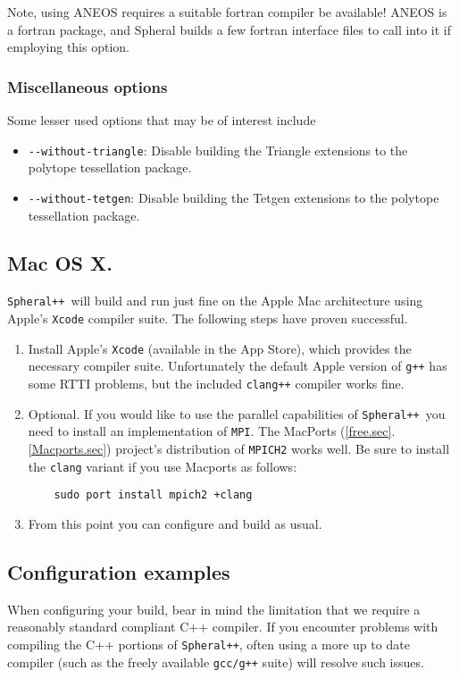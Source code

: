 \documentclass{article}
\newcommand{\Spheral}{{\tt Spheral++}}
\begin{document}
Note, using ANEOS requires a suitable fortran compiler be available!  ANEOS is a
fortran package, and Spheral builds a few fortran interface files to call into
it if employing this option.

\subsubsection{Miscellaneous options}
Some lesser used options that may be of interest include
\begin{itemize}
\item \verb+--without-triangle+: Disable building the Triangle extensions to the
  polytope tessellation package.
\item \verb+--without-tetgen+: Disable building the Tetgen extensions to the
  polytope tessellation package.
\end{itemize}

\subsection{Mac OS X.}
\Spheral\ will build and run just fine on the Apple Mac architecture using
Apple's \verb+Xcode+ compiler suite.  The following steps have proven
successful.
\begin{enumerate}
\item Install Apple's \verb+Xcode+ (available in the App Store), which provides
  the necessary compiler suite.  Unfortunately the default Apple version of
  \verb.g++. has some RTTI problems, but the included \verb.clang++. compiler
  works fine.
\item Optional.  If you would like to use the parallel capabilities of
  \Spheral\ you need to install an implementation of \verb.MPI..  The MacPorts
  (\ref{free.sec}.\ref{Macports.sec}) project's distribution of
  \verb.MPICH2. works well.  Be sure to install the \verb.clang. variant if you
  use Macports as follows:
\begin{verbatim}
    sudo port install mpich2 +clang
\end{verbatim}
\item From this point you can configure and build as usual.
\end{enumerate}

\subsection{Configuration examples}
When configuring your build, bear in mind the limitation that we require a
reasonably standard compliant C++ compiler.  If you encounter problems with
compiling the C++ portions of \Spheral, often using a more up to date compiler
(such as the freely available \verb.gcc/g++. suite) will resolve such issues.
\end{document}
